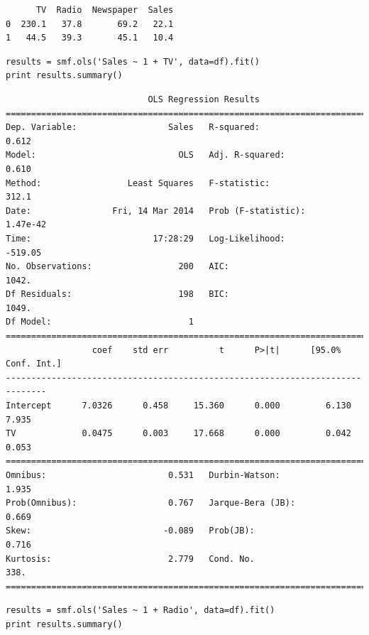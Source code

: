 \documentclass[12pt,fleqn]{article}\usepackage{../common}
\begin{document}
\begin{verbatim}
      TV  Radio  Newspaper  Sales
0  230.1   37.8       69.2   22.1
1   44.5   39.3       45.1   10.4
\end{verbatim}

\begin{verbatim}
results = smf.ols('Sales ~ 1 + TV', data=df).fit()
print results.summary()
\end{verbatim}

\begin{verbatim}
                            OLS Regression Results                            
==============================================================================
Dep. Variable:                  Sales   R-squared:                       0.612
Model:                            OLS   Adj. R-squared:                  0.610
Method:                 Least Squares   F-statistic:                     312.1
Date:                Fri, 14 Mar 2014   Prob (F-statistic):           1.47e-42
Time:                        17:28:29   Log-Likelihood:                -519.05
No. Observations:                 200   AIC:                             1042.
Df Residuals:                     198   BIC:                             1049.
Df Model:                           1                                         
==============================================================================
                 coef    std err          t      P>|t|      [95.0% Conf. Int.]
------------------------------------------------------------------------------
Intercept      7.0326      0.458     15.360      0.000         6.130     7.935
TV             0.0475      0.003     17.668      0.000         0.042     0.053
==============================================================================
Omnibus:                        0.531   Durbin-Watson:                   1.935
Prob(Omnibus):                  0.767   Jarque-Bera (JB):                0.669
Skew:                          -0.089   Prob(JB):                        0.716
Kurtosis:                       2.779   Cond. No.                         338.
==============================================================================
\end{verbatim}

\begin{verbatim}
results = smf.ols('Sales ~ 1 + Radio', data=df).fit()
print results.summary()
\end{verbatim}
\end{document}
